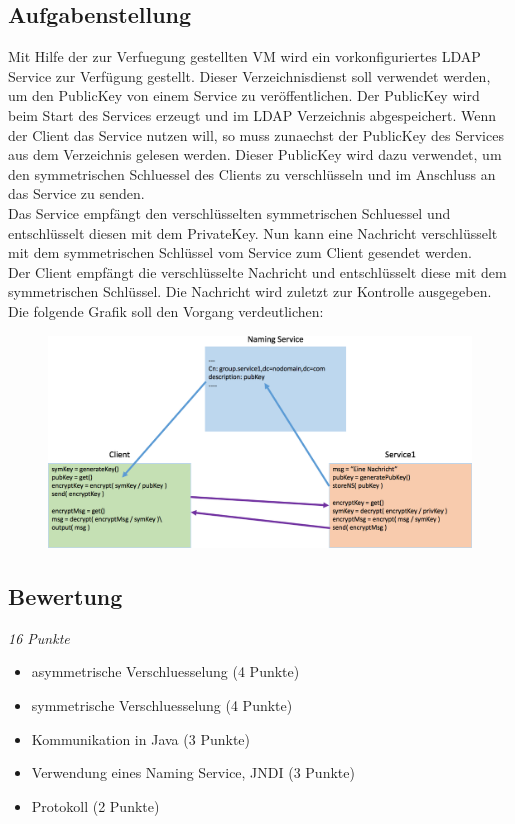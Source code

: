 \documentclass[letterpaper, 12pt]{article}
\let\tempsubsection\subsection
\renewcommand\subsection[1]{\vspace{0cm}\tempsubsection{#1}\vspace{0cm}}
\begin{document}
\subsection{Aufgabenstellung}
Mit Hilfe der zur Verfuegung gestellten VM wird ein vorkonfiguriertes LDAP Service zur Verfügung gestellt. Dieser Verzeichnisdienst soll verwendet werden, um den PublicKey von einem Service zu veröffentlichen. Der PublicKey wird beim Start des Services erzeugt und im LDAP Verzeichnis abgespeichert. Wenn der Client das Service nutzen will, so muss zunaechst der PublicKey des Services aus dem Verzeichnis gelesen werden. Dieser PublicKey wird dazu verwendet, um den symmetrischen Schluessel des Clients zu verschlüsseln und im Anschluss an das Service zu senden. \\
Das Service empfängt den verschlüsselten symmetrischen Schluessel und entschlüsselt diesen mit dem PrivateKey. Nun kann eine Nachricht verschlüsselt mit dem symmetrischen Schlüssel vom Service zum Client gesendet werden. \\
Der Client empfängt die verschlüsselte Nachricht und entschlüsselt diese mit dem symmetrischen Schlüssel. Die Nachricht wird zuletzt zur Kontrolle ausgegeben. \newpage
Die folgende Grafik soll den Vorgang verdeutlichen: 
\begin{figure}[!h]
	\includegraphics[width=1\linewidth]{images/dezsys05_java_security_demo1}
\end{figure}

\subsection{Bewertung}
\textit{16 Punkte}
\begin{itemize}
	\item asymmetrische Verschluesselung (4 Punkte)
	\item symmetrische Verschluesselung (4 Punkte)
	\item Kommunikation in Java (3 Punkte)
	\item Verwendung eines Naming Service, JNDI (3 Punkte)
	\item Protokoll (2 Punkte)
\end{itemize}

\newpage



\lstlistoflistings
\listoffigures
\end{document}
